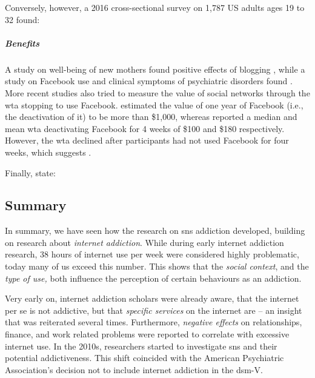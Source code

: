 Conversely, however, a 2016 cross-sectional survey on 1,787 US adults ages 19 to 32 found: \citep{lin_association_2016}

\subparagraph{Benefits} 
A study on well-being of new mothers found positive effects of blogging \citep{mcdaniel_new_2012}, while a study on Facebook use and clinical symptoms of psychiatric disorders found  \citep{rosen_is_2013}.
More recent studies also tried to measure the value of social networks through the \gls{wta} stopping to use Facebook. 
\citet{corrigan_how_2018} estimated the value of one year of Facebook (i.e., the deactivation of it) to be more than \$1,000, whereas \citet{allcott_welfare_2020} reported a median and mean \gls{wta} deactivating Facebook for 4 weeks of \$100 and \$180 respectively. 
However, the \gls{wta} declined after participants had not used Facebook for four weeks, which suggests  \citep{allcott_welfare_2020}.

Finally, \citet{kross_facebook_2013} state: 

\subsection{Summary} 
In summary, we have seen how the research on \gls{sns} addiction developed, building on research about \textit{internet addiction}.
While during early internet addiction research, 38 hours of internet use per week were considered highly problematic, today many of us exceed this number. 
This shows that the \textit{social context}, and the \textit{type of use,} both influence the perception of certain behaviours as an addiction.

Very early on, internet addiction scholars were already aware, that the internet per se is not addictive, but that \textit{specific services} on the internet are -- an insight that was reiterated several times.
Furthermore, \textit{negative effects} on relationships, finance, and work related problems were reported to correlate with excessive internet use.
In the 2010s, researchers started to investigate \gls{sns} and their potential addictiveness.
This shift coincided with the American Psychiatric Association's decision not to include internet addiction in the \gls{dsm}-V.

